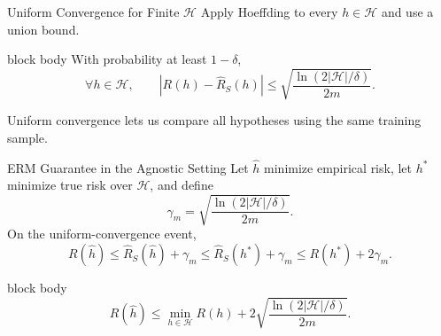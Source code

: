 \documentclass[aspectratio=169,10pt]{beamer}
\newcommand{\Hc}{\mathcal{H}}
\begin{document}
\begin{frame}[t]{Uniform Convergence for Finite $\Hc$}
  \vspace{0.04cm}
  Apply Hoeffding to every $h\in\Hc$ and use a union bound.
  \vspace{0.10cm}
  \begin{beamercolorbox}[rounded=true,sep=0.20cm,wd=0.92\linewidth,center]{block body}
    With probability at least $1-\delta$,
    \[
      \forall h\in\Hc,\qquad
      \left|R(h)-\widehat R_S(h)\right|
      \le
      \sqrt{\frac{\ln\!\left(2|\Hc|/\delta\right)}{2m}}.
    \]
  \end{beamercolorbox}
  \vspace{0.18cm}
  \centering
  Uniform convergence lets us compare all hypotheses using the same training sample.
\end{frame}

\begin{frame}[t]{ERM Guarantee in the Agnostic Setting}
  \vspace{0.02cm}
  Let $\widehat h$ minimize empirical risk, let $h^*$ minimize true risk over $\Hc$, and define
  \[
    \gamma_m=\sqrt{\frac{\ln(2|\Hc|/\delta)}{2m}}.
  \]
  On the uniform-convergence event,
  \[
    R(\widehat h)
    \le \widehat R_S(\widehat h)+\gamma_m
    \le \widehat R_S(h^*)+\gamma_m
    \le R(h^*)+2\gamma_m.
  \]
  \vspace{0.08cm}
  \begin{beamercolorbox}[rounded=true,sep=0.15cm,wd=0.90\linewidth,center]{block body}
    \[
      R(\widehat h)\le \min_{h\in\Hc}R(h)
      +2\sqrt{\frac{\ln(2|\Hc|/\delta)}{2m}}.
    \]
  \end{beamercolorbox}
\end{frame}
\end{document}
